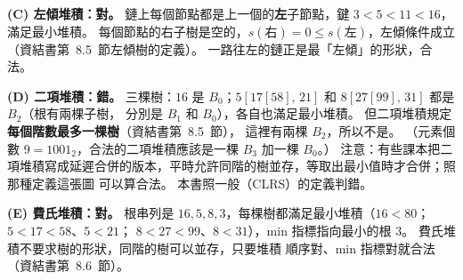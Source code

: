 \begin{pastsoln}
\textbf{(C) 左傾堆積：對。} 鏈上每個節點都是上一個的\textbf{左}子節點，鍵 $3 < 5 < 11 < 16$，滿足最小堆積。
每個節點的右子樹是空的，$s(\text{右}) = 0 \le s(\text{左})$，左傾條件成立（資結書第~8.5~節左傾樹的定義）。
一路往左的鏈正是最「左傾」的形狀，合法。

\textbf{(D) 二項堆積：錯。} 三棵樹：$16$ 是 $B_0$；$5[17[58],\,21]$ 和 $8[27[99],\,31]$ 都是 $B_2$（根有兩棵子樹，
分別是 $B_1$ 和 $B_0$），各自也滿足最小堆積。 但二項堆積規定\textbf{每個階數最多一棵樹}（資結書第~8.5~節），
這裡有兩棵 $B_2$，所以不是。 （元素個數 $9 = 1001_2$，合法的二項堆積應該是一棵 $B_3$ 加一棵 $B_0$。）
注意：有些課本把二項堆積寫成延遲合併的版本，平時允許同階的樹並存，等取出最小值時才合併；照那種定義這張圖
可以算合法。 本書照一般（CLRS）的定義判錯。

\textbf{(E) 費氏堆積：對。} 根串列是 $16, 5, 8, 3$，每棵樹都滿足最小堆積（$16 < 80$；$5 < 17 < 58$、$5 < 21$；
$8 < 27 < 99$、$8 < 31$），min 指標指向最小的根 $3$。 費氏堆積不要求樹的形狀，同階的樹可以並存，只要堆積
順序對、min 指標對就合法（資結書第~8.6~節）。
\end{pastsoln}
